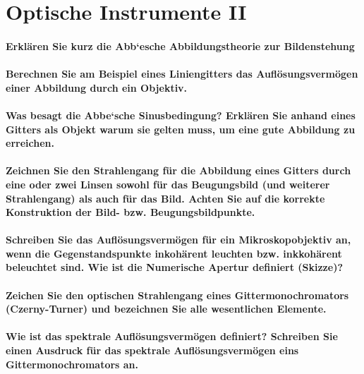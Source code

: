 \documentclass[a4paper, 11pt, parskip=half]{scrartcl}
\begin{document}
\newpage

\section{Optische Instrumente II}

\paragraph{Erklären Sie kurz die Abb‘esche Abbildungstheorie zur Bildenstehung}

\paragraph{Berechnen Sie am Beispiel eines Liniengitters das Auflösungsvermögen einer Abbildung
durch ein Objektiv.}

\paragraph{Was besagt die Abbe‘sche Sinusbedingung? Erklären Sie anhand eines Gitters als Objekt
warum sie gelten muss, um eine gute Abbildung zu erreichen.}

\paragraph{Zeichnen Sie den Strahlengang für die Abbildung eines Gitters durch eine oder zwei Linsen
sowohl für das Beugungsbild (und weiterer Strahlengang) als auch für das Bild. Achten Sie
auf die korrekte Konstruktion der Bild- bzw. Beugungsbildpunkte.}

\paragraph{Schreiben Sie das Auflösungsvermögen für ein Mikroskopobjektiv an, wenn die
Gegenstandspunkte inkohärent leuchten bzw. inkkohärent beleuchtet sind. Wie ist die Numerische
Apertur definiert (Skizze)?}

\paragraph{Zeichen Sie den optischen Strahlengang eines Gittermonochromators (Czerny-Turner) und
bezeichnen Sie alle wesentlichen Elemente.}

\paragraph{Wie ist das spektrale Auflösungsvermögen definiert? Schreiben Sie einen Ausdruck für das
spektrale Auflösungsvermögen eins Gittermonochromators an.}
\end{document}
